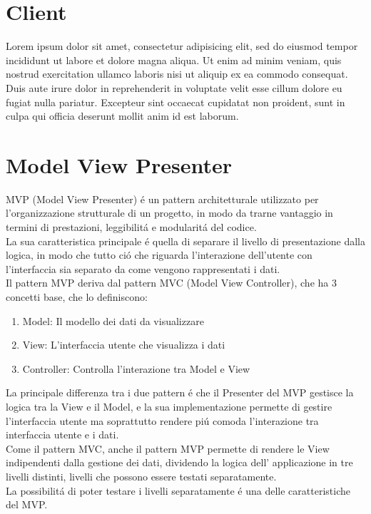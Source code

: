 \section{Client}                 %

Lorem ipsum dolor sit amet, consectetur adipisicing elit, sed do eiusmod tempor incididunt ut labore et dolore magna aliqua. Ut enim ad minim veniam, quis nostrud exercitation ullamco laboris nisi ut aliquip ex ea commodo consequat. Duis aute irure dolor in reprehenderit in voluptate velit esse cillum dolore eu fugiat nulla pariatur. Excepteur sint occaecat cupidatat non proident, sunt in culpa qui officia deserunt mollit anim id est laborum.






   \section{Model View Presenter}                 %
   MVP (Model View Presenter) \'e un pattern architetturale utilizzato per l'organizzazione strutturale di un progetto, in modo da trarne vantaggio in termini di prestazioni, leggibilit\'a e modularit\'a del codice.\\
   La sua caratteristica principale \'e quella di separare il livello di presentazione dalla logica, in modo che tutto ci\'o che riguarda l'interazione dell'utente con l'interfaccia sia separato da come vengono rappresentati i dati.\\
   Il pattern MVP deriva dal pattern MVC (Model View Controller), che ha 3 concetti base, che lo definiscono:

   \begin{enumerate}
   \item Model: Il modello dei dati da visualizzare
   \item View: L'interfaccia utente che visualizza i dati
   \item Controller: Controlla l'interazione tra Model e View
   \end{enumerate}

   La principale differenza tra i due pattern \'e che il Presenter del MVP gestisce la logica tra la View e il Model, e la sua implementazione permette di gestire l'interfaccia utente ma soprattutto rendere pi\'u comoda l'interazione tra interfaccia utente e i dati.\\


   Come il pattern MVC, anche il pattern MVP permette di rendere le View indipendenti dalla gestione dei dati, dividendo la logica dell' applicazione in tre livelli distinti, livelli che possono essere testati separatamente.\\
   La possibilit\'a di poter testare i livelli separatamente \'e una delle caratteristiche del MVP.\@


